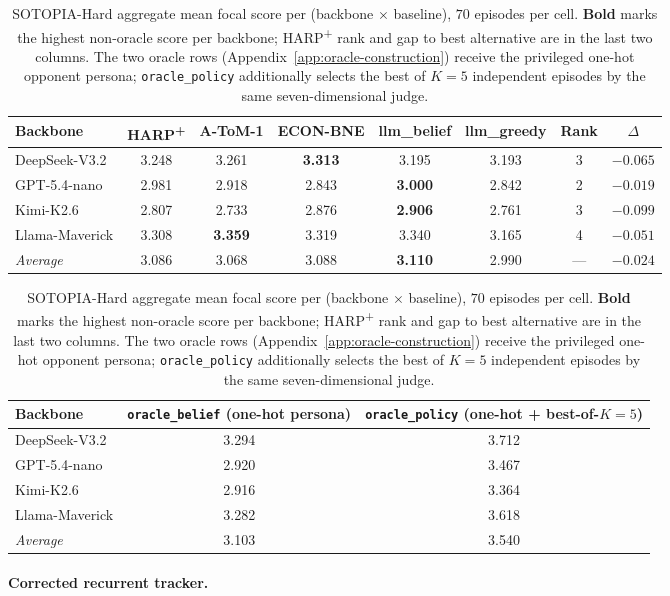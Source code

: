 \begin{table}[h]
\centering\small
\caption{SOTOPIA-Hard aggregate mean focal score per (backbone $\times$ baseline), $70$ episodes per cell. \textbf{Bold} marks the highest non-oracle score per backbone; HARP\textsuperscript{+} rank and gap to best alternative are in the last two columns. The two oracle rows (Appendix~\ref{app:oracle-construction}) receive the privileged one-hot opponent persona; \texttt{oracle\_policy} additionally selects the best of $K{=}5$ independent episodes by the same seven-dimensional judge.}
\label{tab:sotopia-aggregate}
\begin{tabular}{lccccccc}
\toprule
Backbone & HARP\textsuperscript{+} & A-ToM-1 & ECON-BNE & llm\_belief & llm\_greedy & Rank & $\Delta$ \\
\midrule
DeepSeek-V3.2 & 3.248 & 3.261 & \textbf{3.313} & 3.195 & 3.193 & 3 & $-0.065$ \\
GPT-5.4-nano & 2.981 & 2.918 & 2.843 & \textbf{3.000} & 2.842 & 2 & $-0.019$ \\
Kimi-K2.6 & 2.807 & 2.733 & 2.876 & \textbf{2.906} & 2.761 & 3 & $-0.099$ \\
Llama-Maverick & 3.308 & \textbf{3.359} & 3.319 & 3.340 & 3.165 & 4 & $-0.051$ \\
\midrule
\emph{Average} & 3.086 & 3.068 & 3.088 & \textbf{3.110} & 2.990 & --- & $-0.024$ \\
\bottomrule
\end{tabular}

\vspace{4pt}
\begin{tabular}{lcc}
\toprule
Backbone & \texttt{oracle\_belief} (one-hot persona) & \texttt{oracle\_policy} (one-hot + best-of-$K{=}5$) \\
\midrule
DeepSeek-V3.2 & 3.294 & 3.712 \\
GPT-5.4-nano  & 2.920 & 3.467 \\
Kimi-K2.6     & 2.916 & 3.364 \\
Llama-Maverick & 3.282 & 3.618 \\
\midrule
\emph{Average} & 3.103 & 3.540 \\
\bottomrule
\end{tabular}
\end{table}

\paragraph{Corrected recurrent tracker.}
\label{app:sotopia-corrected}

